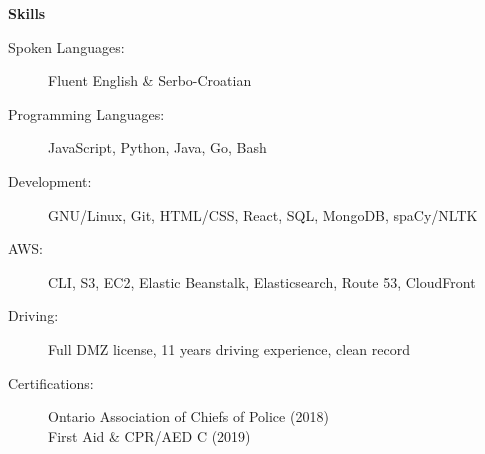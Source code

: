 \documentclass[letterpaper,11pt]{article}
\begin{document}
\begin{mdframed}[backgroundcolor=light-gray]
\textbf{Skills}
\end{mdframed}

\begin{description}
\item[Spoken Languages:]
Fluent English \& Serbo-Croatian
\item[Programming Languages:]
JavaScript, Python, Java, Go, Bash
\item[Development:]
GNU/Linux, Git, HTML/CSS, React, SQL, MongoDB, spaCy/NLTK
\item[AWS:]
CLI, S3, EC2, Elastic Beanstalk, Elasticsearch, Route 53, CloudFront
\item[Driving:]
Full DMZ license, 11 years driving experience, clean record
\item[Certifications:]
\hfill\break
Ontario Association of Chiefs of Police (2018) \\
First Aid \& CPR/AED C (2019)
\end{description}
\end{document}

